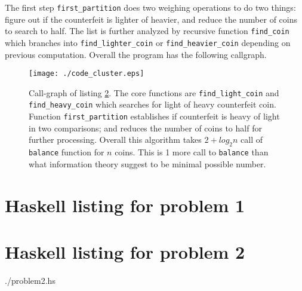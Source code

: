 \documentclass[a4paper,10pt]{article}
\begin{document}
The first step \texttt{first\_partition} does two weighing operations
to do   two things: figure out if the counterfeit is lighter of heavier, and reduce
the number of coins to search to half. The list is further analyzed by recursive
function \texttt{find\_coin} which branches into \texttt{find\_lighter\_coin} or
\texttt{find\_heavier\_coin} depending on previous computation. Overall the
program has the following callgraph.

\begin{figure}[ht!]
\begin{center}
    \texttt{[image: ./code\_cluster.eps]}
\end{center}

\caption{Call-graph of listing \ref{listing:b}. The core functions are
    \texttt{find\_light\_coin} and \texttt{find\_heavy\_coin} which searches for
    light of heavy counterfeit coin. Function \texttt{first\_partition}
    establishes if counterfeit is heavy of light in two comparisons; and reduces
    the number of coins to half for further processing. Overall this algorithm
    takes $2+log_2 n$ call of \texttt{balance} function for $n$ coins.  This is
    1 more call to \texttt{balance} than what information theory suggest to be
minimal possible number.}

\label{fig:}
\end{figure}

\begin{appendices}
    \section{Haskell listing for problem 1}
    \label{listing:a}
    

    \section{Haskell listing for problem 2}
    \label{listing:b}
    
        {./problem2.hs}
\end{appendices}
\end{document}

